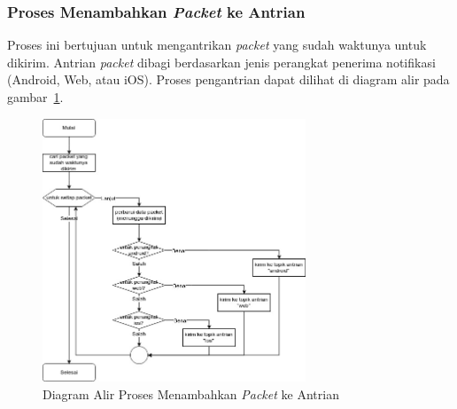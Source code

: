 \subsubsection{Proses Menambahkan \textit{Packet} ke Antrian}
\par Proses ini bertujuan untuk mengantrikan \textit{packet} yang sudah waktunya untuk dikirim.
Antrian
\textit{packet} dibagi berdasarkan jenis perangkat penerima notifikasi (Android, Web, atau iOS).
Proses pengantrian
dapat dilihat di diagram alir pada gambar~\ref{flowchart_menambahkan_packet_ke_antrian}.
\begin{figure}[!ht]
    \centering\includegraphics[width=0.7\textwidth]{bab3/figures/flowchart_menambahkan_packet_ke_antrian.jpg}
    \caption{Diagram Alir Proses Menambahkan \textit{Packet} ke Antrian}
    \label{flowchart_menambahkan_packet_ke_antrian}
\end{figure}

